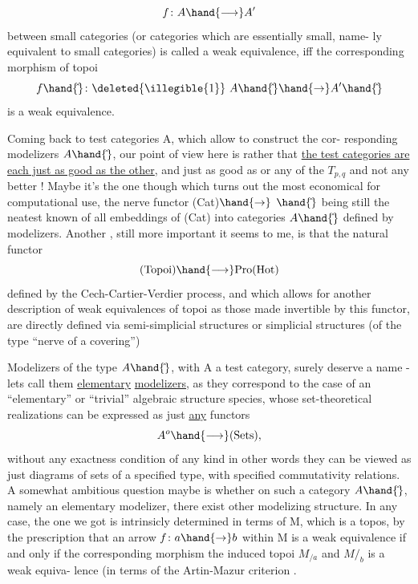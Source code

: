\[ f\colon A \hand{\longrightarrow} A' \]
between small categories (or categories which are essentially small, name-%
ly equivalent to small categories) is called a weak equivalence, iff the
corresponding morphism of topoi
\[ f\hand{\hat{}}\colon \deleted{\illegible{1}}\ A\hand{\hat{}} \hand{\to} A'\hand{\hat{}} \]
is a weak equivalence.

Coming back to test categories A, which allow to construct the cor-%
responding modelizers $A\hand{\hat{}}$, our point of view here is rather that \uline{the test
categories are each just as good  as the other}, and \hand{$\Delta$} just as good as
\hand{$\Box$} or any of the $T_{p,q}$ and not any better ! Maybe it's the one though which
turns out the most economical for computational use, the nerve functor
(Cat)$\hand{\to}$ \hand{$\Delta$}$\hand{\hat{}}$ being still the neatest known of all  embeddings of (Cat) into
categories $A\hand{\hat{}}$ defined by modelizers. Another , still more important 
it seems to me, is that the natural functor
\[ \text{(Topoi)} \hand{\longrightarrow} \text{Pro(Hot)} \]
defined by the \hand{\v{}}Cech-Cartier-Verdier process, and which allows for another
description of weak equivalences of topoi\hand{,}  as those made invertible by this
functor, are directly defined via semi-simplicial structures or simplicial
structures (of the type ``nerve of a covering'')

Modelizers of the type $A\hand{\hat{}}$, with A a test category, surely deserve
a name - lets call them \uline{elementary} \uline{modelizers}, as they correspond to 
the case of an ``elementary'' or ``trivial'' algebraic structure species,
whose set-theoretical realizations can be expressed as just \uline{any} functors
\[ A^{o} \hand{\longrightarrow} \text{(Sets)} , \]
without any exactness condition of any kind\over{,}{;} in other words they can
be viewed as just diagrams of sets of a specified type, with specified
commutativity relations. A somewhat ambitious question maybe is whether
on such a category  $A\hand{\hat{}}$, namely an elementary modelizer, there   exist
 other modelizing structure. In any case, the one we got is intrinsicly
determined in terms of M, which is a topos, by the prescription that
an arrow $f\colon a \hand{\to} b$ within M is a weak equivalence if and only if the
corresponding morphism   the induced topoi $M_{/a}$ and $M/_{b}$ is a weak equiva-%
lence (in terms of the Artin-Mazur criterion  \hand{)}.

